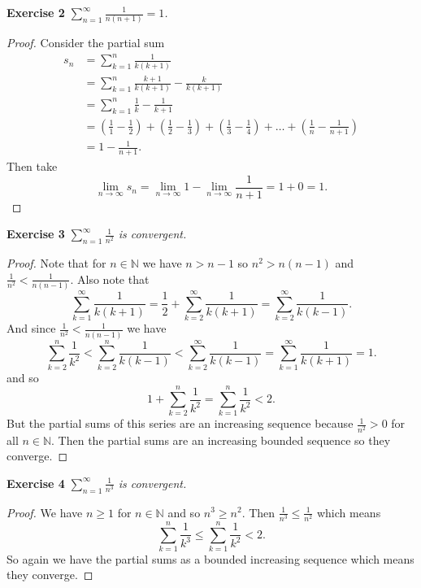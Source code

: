 \documentclass{article}
\begin{document}
\begin{flushleft}
\textbf{Exercise 2}
\textsl{$\sum_{n=1}^{\infty} \frac{1}{n(n+1)}=1$.}
\begin{proof}
Consider the partial sum
\begin{align*}
s_n & = \sum_{k=1}^{n} \frac{1}{k(k+1)} \\
	& = \sum_{k=1}^{n} \frac{k+1}{k(k+1)} - \frac{k}{k(k+1)} \\
	& = \sum_{k=1}^{n} \frac{1}{k} - \frac{1}{k+1} \\
	& = (\frac{1}{1} - \frac{1}{2}) + (\frac{1}{2}-\frac{1}{3}) + (\frac{1}{3} - \frac{1}{4}) + \dots + (\frac{1}{n} - \frac{1}{n+1}) \\
	& = 1 - \frac{1}{n+1}.
\end{align*}
Then take
\[
\lim_{n \rightarrow \infty} s_n = \lim_{n \rightarrow \infty} 1 - \lim_{n \rightarrow \infty} \frac{1}{n+1} = 1 + 0 = 1.
\]
\end{proof}

\textbf{Exercise 3}
\textsl{$\sum_{n=1}^{\infty} \frac{1}{n^2}$ is convergent.}
\begin{proof}
Note that for $n \in \mathbb{N}$ we have $n > n-1$ so $n^2 > n(n-1)$ and $\frac{1}{n^2} < \frac{1}{n(n-1)}$. Also note that
\[
\sum_{k = 1}^{\infty} \frac{1}{k(k+1)} = \frac{1}{2} + \sum_{k=2}^{\infty} \frac{1}{k(k+1)} = \sum_{k=2}^{\infty} \frac{1}{k(k-1)}.
\]
And since $\frac{1}{n^2} < \frac{1}{n(n-1)}$ we have
\[
\sum_{k=2}^{n} \frac{1}{k^2} < \sum_{k=2}^{n} \frac{1}{k(k-1)} < \sum_{k=2}^{\infty} \frac{1}{k(k-1)} = \sum_{k=1}^{\infty} \frac{1}{k(k+1)} = 1.
\]
and so
\[
1 + \sum_{k=2}^{n} \frac{1}{k^2} = \sum_{k=1}^{n} \frac{1}{k^2} < 2.
\]
But the partial sums of this series are an increasing sequence because $\frac{1}{n^2} > 0$ for all $n \in \mathbb{N}$. Then the partial sums are an increasing bounded sequence so they converge.
\end{proof}

\textbf{Exercise 4}
\textsl{$\sum_{n=1}^{\infty} \frac{1}{n^3}$ is convergent.}
\begin{proof}
We have $n \geq 1$ for $n \in \mathbb{N}$ and so $n^3 \geq n^2$. Then $\frac{1}{n^3} \leq \frac{1}{n^2}$ which means
\[
\sum_{k=1}^{n} \frac{1}{k^3} \leq \sum_{k=1}^{n} \frac{1}{k^2} < 2.
\]
So again we have the partial sums as a bounded increasing sequence which means they converge.
\end{proof}


\end{flushleft}
\end{document}
